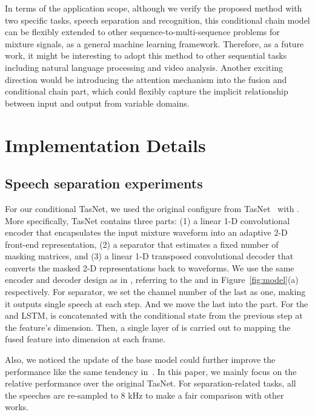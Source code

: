 \documentclass{article}
\begin{document}
In terms of the application scope, although we verify the proposed method with two specific tasks, speech separation and recognition, this conditional chain model can be flexibly extended to other sequence-to-multi-sequence problems for mixture signals, as a general machine learning framework.
Therefore, as a future work, it might be interesting to adopt this method to other sequential tasks including natural language processing and video analysis. 
Another exciting direction would be introducing the attention mechanism into the fusion and conditional chain part, which could flexibly capture the implicit relationship between input and output from variable domains.






\appendix
\section{Implementation Details}
\label{appendix:details}
\subsection{Speech separation experiments}


For our conditional TasNet, we used the original configure from TasNet~\cite{luo2018tasnet} with .  More specifically, TasNet contains three parts: (1) a linear 1-D convolutional encoder that encapsulates the input mixture waveform into an adaptive 2-D front-end representation, (2) a separator that estimates a fixed number of masking matrices, and (3) a linear 1-D transposed convolutional decoder that converts the masked 2-D representations back to waveforms. We use the same encoder and decoder design as in \cite{luo2018tasnet}, referring to the  and  in Figure~\ref{fig:model}(a) respectively. For separator, we set the channel number of the last  as one, making it outputs single speech  at each step. And we move the last  into the  part. For the  and LSTM,  is concatenated with the conditional state from the previous step  at the feature's dimension. Then, a single layer of  is carried out to mapping the fused feature into  dimension at each frame. 

Also, we noticed the update of the base model could further improve the performance like the same tendency in~\cite{luo2019conv,luo2019dual}. In this paper, we mainly focus on the relative performance over the original TasNet. For separation-related tasks, all the speeches are re-sampled to 8 kHz to make a fair comparison with other works.
\end{document}
